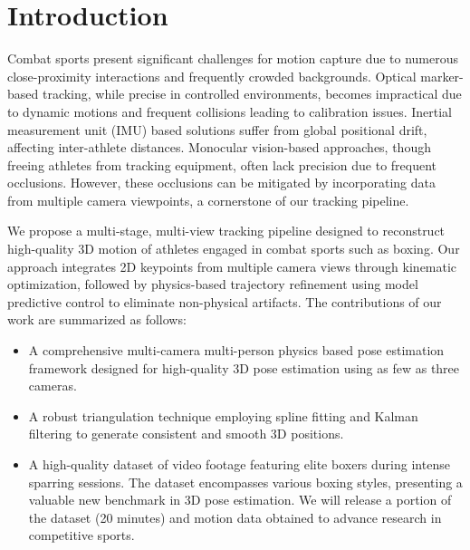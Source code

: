 \documentclass{egpubl}
\begin{document}
\section{Introduction}
Combat sports present significant challenges for motion capture due to numerous close-proximity interactions and frequently crowded backgrounds. Optical marker-based tracking, while precise in controlled environments, becomes impractical due to dynamic motions and frequent collisions leading to calibration issues. Inertial measurement unit (IMU) based solutions suffer from global positional drift, affecting inter-athlete distances. Monocular vision-based approaches, though freeing athletes from tracking equipment, often lack precision due to frequent occlusions. However, these occlusions can be mitigated by incorporating data from multiple camera viewpoints, a cornerstone of our tracking pipeline.

We propose a multi-stage, multi-view tracking pipeline designed to reconstruct high-quality 3D motion of athletes engaged in combat sports such as boxing. Our approach integrates 2D keypoints from multiple camera views through kinematic optimization, followed by physics-based trajectory refinement using model predictive control to eliminate non-physical artifacts. 
The contributions of our work are summarized as follows:
\begin{itemize}
    \item A comprehensive multi-camera multi-person physics based pose estimation framework designed for high-quality 3D pose estimation using as few as three cameras.
    \item A robust triangulation technique employing spline fitting and Kalman filtering to generate consistent and smooth 3D positions.
    \item A high-quality dataset of video footage featuring elite boxers during intense sparring sessions. The dataset encompasses various boxing styles, presenting a valuable new benchmark in 3D pose estimation. We will release a portion of the dataset (20 minutes) and motion data obtained to advance research in competitive sports.
\end{itemize}



\label{sec:results} 
\end{document}
